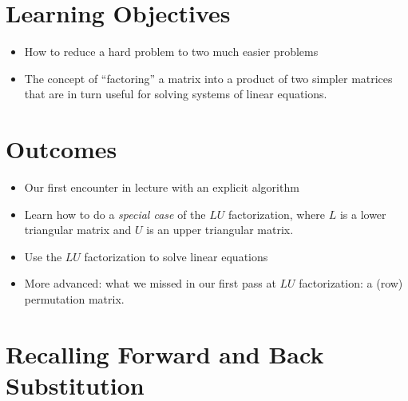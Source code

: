 \section*{Learning Objectives}
\begin{itemize}
\item How to reduce a hard problem to two much easier problems
\item The concept of ``factoring'' a matrix into a product of two simpler matrices that are in turn useful for solving systems of linear equations. 
\end{itemize}

\section*{Outcomes}
\begin{itemize}
\item Our first encounter in lecture with an explicit algorithm
\item Learn how to do a \textit{special case} of the $LU$ factorization, where $L$ is a lower triangular matrix and $U$ is an upper triangular matrix.

    \item Use the $LU$ factorization to solve linear equations

    \item More advanced: what we missed in our first pass at $LU$ factorization: a (row) permutation matrix.
\end{itemize}
\newpage

\section{Recalling Forward and Back Substitution}

